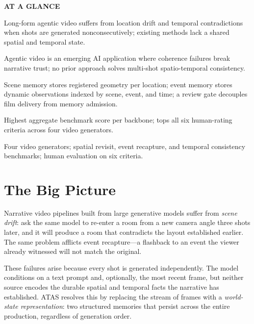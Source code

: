 \documentclass[10pt,twocolumn]{article}
\begin{document}
\begin{mdframed}[backgroundcolor=boxgray,linecolor=rulered,linewidth=1pt,
    innerleftmargin=6pt,innerrightmargin=6pt,
    innertopmargin=6pt,innerbottommargin=6pt]
\textbf{\small AT A GLANCE}\par\vspace{4pt}
\begin{description}[leftmargin=0pt,labelsep=4pt,itemsep=2pt,parsep=0pt,
    font=\small\bfseries]
  \item[Problem:] Long-form agentic video suffers from location drift and temporal
    contradictions when shots are generated nonconsecutively; existing methods
    lack a shared spatial and temporal state.
  \item[Why it matters:] Agentic video is an emerging AI application where
    coherence failures break narrative trust; no prior approach solves
    multi-shot spatio-temporal consistency.
  \item[Method:] Scene memory stores registered geometry per location; event
    memory stores dynamic observations indexed by scene, event, and time;
    a review gate decouples film delivery from memory admission.
  \item[Result:] Highest aggregate benchmark score per backbone; tops all six
    human-rating criteria across four video generators.
  \item[Evidence:] Four video generators; spatial revisit, event recapture, and
    temporal consistency benchmarks; human evaluation on six criteria.
\end{description}
\end{mdframed}

\section{The Big Picture}

Narrative video pipelines built from large generative models suffer from
\emph{scene drift}: ask the same model to re-enter a room from a new camera
angle three shots later, and it will produce a room that contradicts the
layout established earlier. The same problem afflicts event recapture---a
flashback to an event the viewer already witnessed will not match the original.

These failures arise because every shot is generated independently. The model
conditions on a text prompt and, optionally, the most recent frame, but neither
source encodes the durable spatial and temporal facts the narrative has
established. ATAS resolves this by replacing the stream of frames with a
\emph{world-state representation}: two structured memories that persist across
the entire production, regardless of generation order.
\end{document}
